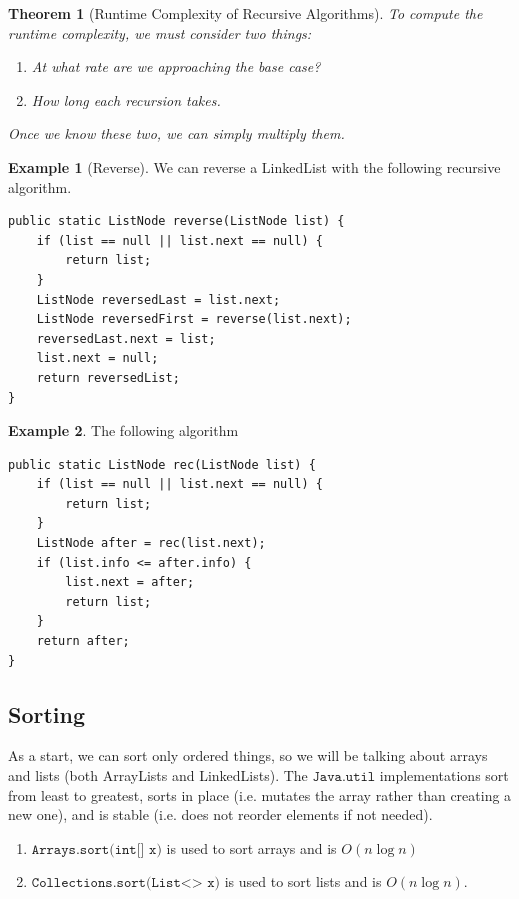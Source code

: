 \documentclass{article}
\newtheorem{theorem}{Theorem}[section]
\theoremstyle{definition}
\newtheorem{example}{Example}[section]
\theoremstyle{remark}
\theoremstyle{definition}
\begin{document}
\begin{theorem}[Runtime Complexity of Recursive Algorithms]
To compute the runtime complexity, we must consider two things: 
\begin{enumerate}
    \item At what rate are we approaching the base case? 
    \item How long each recursion takes. 
\end{enumerate}
Once we know these two, we can simply multiply them. 
\end{theorem}

\begin{example}[Reverse]
We can reverse a LinkedList with the following recursive algorithm. 
\begin{verbatim}
public static ListNode reverse(ListNode list) {
    if (list == null || list.next == null) {
        return list; 
    }
    ListNode reversedLast = list.next; 
    ListNode reversedFirst = reverse(list.next); 
    reversedLast.next = list; 
    list.next = null; 
    return reversedList; 
}
\end{verbatim}
\end{example}

\begin{example}
The following algorithm 
\begin{verbatim}
public static ListNode rec(ListNode list) {
    if (list == null || list.next == null) {
        return list; 
    }
    ListNode after = rec(list.next); 
    if (list.info <= after.info) {
        list.next = after; 
        return list; 
    }
    return after; 
}
\end{verbatim}
\end{example}

\subsection{Sorting}

As a start, we can sort only ordered things, so we will be talking about arrays and lists (both ArrayLists and LinkedLists). The $\texttt{Java.util}$ implementations sort from least to greatest, sorts in place (i.e. mutates the array rather than creating a new one), and is stable (i.e. does not reorder elements if not needed). 
\begin{enumerate}
    \item $\texttt{Arrays.sort(int[] x)}$ is used to sort arrays and is $O(n \log{n})$ 
    \item $\texttt{Collections.sort(List<> x)}$ is used to sort lists and is $O(n \log{n})$. 
\end{enumerate}
\end{document}
